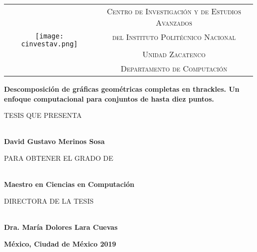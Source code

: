 \thispagestyle{empty}

\begin{tabular}{cc}
\multirow{5}{*}{\texttt{[image: cinvestav.png]}} & \textsc{Centro de Investigaci\'on y de Estudios Avanzados} \\
  & \textsc{del Instituto Polit\'ecnico Nacional} \\
  & \\
  & \textsc{Unidad Zacatenco} \\
  & \textsc{Departamento de Computaci\'on} \\
\end{tabular}

\vspace{2cm}

\begin{center}
{
  \textbf{\Large Descomposición de gráficas geométricas completas en thrackles. Un
  enfoque computacional para conjuntos de hasta diez puntos.}\\

  {\large
    \vspace{2cm}
    \begin{small} TESIS QUE PRESENTA \end{small} \\
    \textbf{David Gustavo Merinos Sosa} \\

    \vspace{1cm}
    \begin{small} PARA OBTENER EL GRADO DE \end{small} \\
    \textbf{Maestro en Ciencias en Computaci\'on} \\

    \vspace{2cm}
    \begin{small} DIRECTORA DE LA TESIS \end{small}\\
    \textbf{Dra. María Dolores Lara Cuevas} \\
  }
}
\end{center}

\vfill

\textbf{M\'exico, Ciudad de M\'exico \hfill  2019}
\newpage
